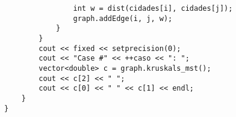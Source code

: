 \begin{lstlisting}
                int w = dist(cidades[i], cidades[j]);
                graph.addEdge(i, j, w);
            }
        }
        cout << fixed << setprecision(0);
        cout << "Case #" << ++caso << ": ";
        vector<double> c = graph.kruskals_mst();
        cout << c[2] << " ";
        cout << c[0] << " " << c[1] << endl;
    }
}
\end{lstlisting}